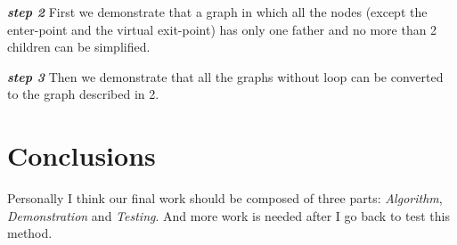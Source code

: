 \documentclass[12pt]{article}
\begin{document}
\textit{\textbf{step 2 }}	 First we demonstrate that a graph in which all the nodes (except the enter-point and the virtual exit-point) has only one father and no more than 2 children can be simplified.\

\textit{\textbf{step 3 }}	Then we demonstrate that all the graphs without loop can be converted to the graph described in 2.


\section{Conclusions}
Personally I think our final work should be composed of three parts: \textit{Algorithm}, \textit{Demonstration} and \textit{Testing}. And more work is needed after I go back to test this method.
\end{document}

